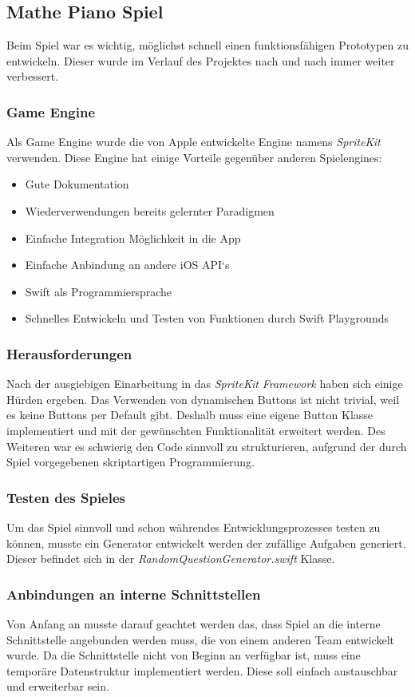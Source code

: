 \subsection{Mathe Piano Spiel}
Beim Spiel war es wichtig, möglichst schnell einen funktionsfähigen Prototypen zu entwickeln. Dieser wurde im Verlauf des Projektes nach und nach immer weiter verbessert.
\subsubsection{Game Engine}
Als Game Engine wurde die von Apple entwickelte Engine namens \textit{SpriteKit} verwenden. Diese Engine hat einige Vorteile gegenüber anderen Spielengines:
\begin{itemize}
\item Gute Dokumentation
\item Wiederverwendungen bereits gelernter Paradigmen    
\item Einfache Integration Möglichkeit in die App
\item Einfache Anbindung an andere iOS API‘s
\item Swift als Programmiersprache 
\item Schnelles Entwickeln und Testen von Funktionen durch Swift Playgrounds
\end{itemize}

\subsubsection{Herausforderungen}
Nach der ausgiebigen Einarbeitung in das \textit{SpriteKit} \textit{Framework} haben sich einige Hürden ergeben. Das Verwenden von dynamischen Buttons ist nicht trivial, weil es keine Buttons per Default gibt. Deshalb muss eine eigene Button Klasse implementiert und mit der gewünschten Funktionalität erweitert werden. Des Weiteren war es schwierig den Code sinnvoll zu strukturieren, aufgrund der durch Spiel vorgegebenen skriptartigen Programmierung. %
\subsubsection{Testen des Spieles}
Um das Spiel sinnvoll und schon währendes Entwicklungsprozesses testen zu können, musste ein Generator entwickelt werden der zufällige Aufgaben generiert. Dieser befindet sich in der \textit{RandomQuestionGenerator.swift} Klasse. 
\subsubsection{Anbindungen an interne Schnittstellen}
Von Anfang an musste darauf geachtet werden das, dass Spiel an die interne Schnittstelle angebunden werden muss, die von einem anderen Team entwickelt wurde. Da die Schnittstelle nicht von Beginn an verfügbar ist, muss eine temporäre Datenstruktur implementiert werden. Diese soll einfach austauschbar und erweiterbar sein.
